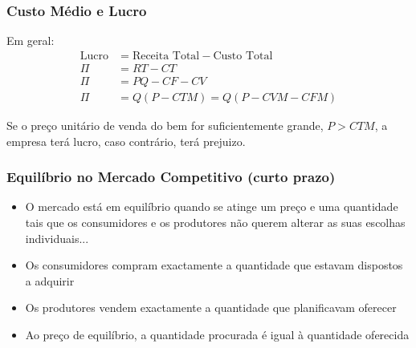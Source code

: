 \begin{frame}
	\frametitle{Custo M\'edio e Lucro}
	Em geral:
	\begin{align*}
		\text{Lucro} &= \text{Receita Total} - \text{Custo Total}\\
		\Pi &= RT - CT \\
		\Pi &= PQ-CF-CV \\
		\Pi &= Q(P-CTM) = Q(P-CVM-CFM)
	\end{align*}

	Se o pre\c co unit\'ario de venda do bem for suficientemente grande, $P>CTM$, a empresa ter\'a lucro, caso contr\'ario, ter\'a prejuizo.
\end{frame}

\begin{frame}
	\frametitle{Equil\'ibrio no Mercado Competitivo (curto prazo)}
	\begin{itemize}
		\item O mercado est\'a em equil\'ibrio quando se atinge um pre\c co e uma quantidade tais que os consumidores e os produtores n\~ao querem alterar as suas escolhas individuais...\pause
		\item Os consumidores compram exactamente a quantidade que estavam dispostos a adquirir\pause
		\item Os produtores vendem exactamente a quantidade que planificavam oferecer\pause
		\item Ao pre\c co de equil\'ibrio, a quantidade procurada \'e igual \`a quantidade oferecida
	\end{itemize}
\end{frame}

